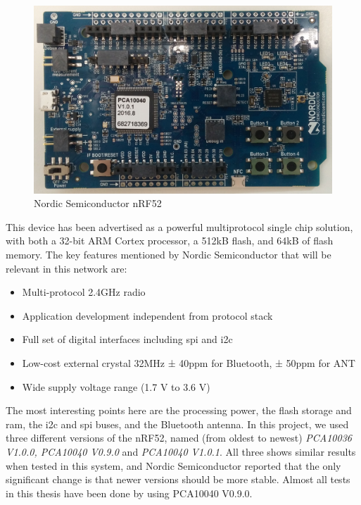 \begin{figure}[ht]
    \centering
    \includegraphics[width=1.0\textwidth]{nRF522.png}    
    \caption{Nordic Semiconductor nRF52 }
    \label{fig:nrf52picture}
\end{figure}


\noindent This device has been advertised as a powerful multiprotocol single chip solution, with both a 32-bit ARM Cortex processor, a 512kB flash, and 64kB of flash memory. The key features mentioned by Nordic Semiconductor \cite{nrf52Nordic} that will be relevant in this network are: 

\begin{itemize}
	\item Multi-protocol 2.4GHz radio
	\item Application development independent from protocol stack
	\item Full set of digital interfaces including \gls{spi} and \gls{i2c}
	\item Low-cost external crystal 32MHz ± 40ppm for Bluetooth, ± 50ppm for ANT
	\item Wide supply voltage range (1.7 V to 3.6 V)
\end{itemize}


\noindent The most interesting points here are the processing power, the flash storage and \gls{ram}, the \gls{i2c} and \gls{spi} buses, and the Bluetooth antenna. In this project, we used three different versions of the \gls{nRF52}, named (from oldest to newest) \textit{PCA10036 V1.0.0, PCA10040 V0.9.0} and \textit{PCA10040 V1.0.1}. All three shows similar results when tested in this system, and Nordic Semiconductor reported that the only significant change is that newer versions should be more stable. Almost all tests in this thesis have been done by using PCA10040 V0.9.0. 

